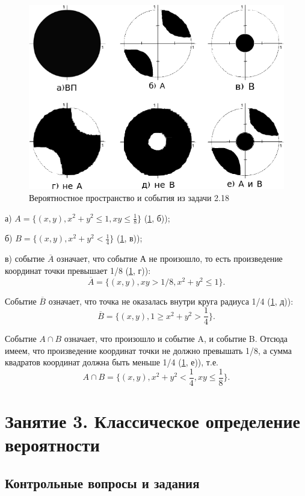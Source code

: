 \documentclass{book}
\begin{document}
\begin{figure}[h!]
  \centering
  \includegraphics[width=.7\textwidth]{./pictures/2_18.png}
  \caption{Вероятностное пространство и события из задачи 2.18}
  \label{fig:218}
\end{figure}

а) $ A =
\{ (x, y), x^2 + y^2 \leq 1, xy \leq \frac{ 1 }{ 8 } \} $ (\ref{fig:218}, б));

б) $ B =
\{ (x, y), x^2 + y^2 < \frac{ 1 }{ 4 } \} $ (\ref{fig:218}, в));

в) событие $ \overline{ A } $ означает, что событие А не произошло, то есть произведение координат точки превышает 1/8 (\ref{fig:218}, г)):
$$ \overline{ A } =
\{ (x, y), xy > 1/8, x^2 + y^2 \leq 1 \}.$$

Событие $ \overline{ B } $ означает, что точка не оказалась внутри круга радиуса 1/4 (\ref{fig:218}, д)):
$$ \overline{ B } =
\{ (x, y), 1 \geq x^2 + y^2 > \frac{ 1 }{ 4 } \}.$$

Событие $ A \cap B $ означает, что произошло и событие A, и событие B.
Отсюда имеем, что произведение координат точки не должно превышать 1/8, а сумма квадратов координат должна быть меньше 1/4 (\ref{fig:218}, е)), т.е.
$$ A \cap B =
\{ (x, y), x^2 + y^2 < \frac{ 1 }{ 4 }, xy \leq \frac{ 1 }{ 8 } \}.$$

\chapter*{Занятие 3. Классическое определение вероятности}

\section*{Контрольные вопросы и задания}
\end{document}
